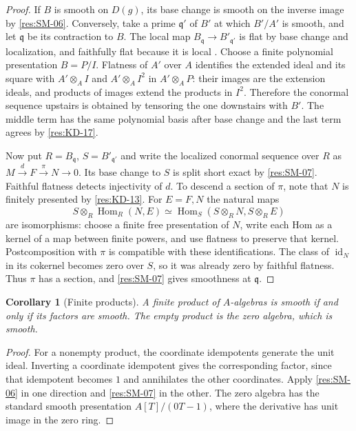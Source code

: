 \documentclass[11pt,oneside,openany]{book}
\newtheorem{corollary}[theorem]{Corollary}
\theoremstyle{definition}
\theoremstyle{remark}
\begin{document}
\begin{proof}
If $B$ is smooth on $D(g)$, its base change is smooth on the
inverse image by \ref{res:SM-06}. Conversely, take a prime
$\mathfrak q'$ of $B'$ at which $B'/A'$ is smooth, and let
$\mathfrak q$ be its contraction to $B$. The local map
$B_{\mathfrak q}\to B'_{\mathfrak q'}$ is flat by base change
and localization, and faithfully flat because it is local
\cite[Theorems ALG-03-C02-S04 and ALG-05-C01-R04]{p103}.
Choose a finite polynomial presentation $B=P/I$.
Flatness of $A'$ over $A$ identifies the extended ideal and
its square with $A'\otimes_A I$ and $A'\otimes_A I^2$ in
$A'\otimes_A P$: their images are the extension ideals, and
products of images extend the products in $I^2$. Therefore
the conormal sequence upstairs is obtained by tensoring the
one downstairs with $B'$. The middle term has the same
polynomial basis after base change and the last term agrees
by \ref{res:KD-17}.

Now put $R=B_{\mathfrak q}$, $S=B'_{\mathfrak q'}$ and write
the localized conormal sequence over $R$ as
$M\xrightarrow{d}F\xrightarrow{\pi}N\to0$.
Its base change to $S$ is split short exact by
\ref{res:SM-07}. Faithful flatness detects injectivity of $d$.
To descend a section of $\pi$, note that $N$ is finitely
presented by \ref{res:KD-13}. For $E=F,N$ the natural maps
\[
  S\otimes_R\operatorname{Hom}_R(N,E)
    \simeq \operatorname{Hom}_S(S\otimes_R N,S\otimes_R E)
\]
are isomorphisms: choose a finite free presentation of $N$,
write each Hom as a kernel of a map between finite powers,
and use flatness to preserve that kernel. Postcomposition with
$\pi$ is compatible with these identifications. The class
of $\operatorname{id}_N$ in its cokernel becomes zero over
$S$, so it was already zero by faithful flatness. Thus $\pi$
has a section, and \ref{res:SM-07} gives smoothness at
$\mathfrak q$.
\end{proof}

\begin{corollary}[Finite products]
\label{res:SM-14}
A finite product of $A$-algebras is smooth if and only if its
factors are smooth. The empty product is the zero algebra,
which is smooth.
\end{corollary}

\begin{proof}
For a nonempty product, the coordinate idempotents generate
the unit ideal. Inverting a coordinate idempotent gives the
corresponding factor, since that idempotent becomes $1$ and
annihilates the other coordinates. Apply \ref{res:SM-06} in
one direction and \ref{res:SM-07} in the other. The zero
algebra has the standard smooth presentation $A[T]/(0T-1)$,
where the derivative has unit image in the zero ring.
\end{proof}
\end{document}
